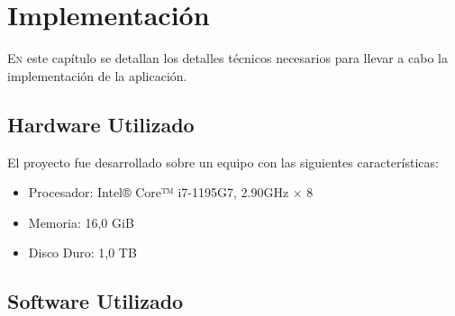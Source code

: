\chapter{Implementación}
\label{chap:implementacion}


\lettrine{E}{n} este capítulo se detallan los detalles técnicos necesarios para llevar a cabo la implementación de la aplicación.


\section{Hardware Utilizado}
\label{sec:hw}
El proyecto fue desarrollado sobre un equipo con las siguientes características:
\begin{itemize}
\item Procesador: Intel® Core™ i7-1195G7, 2.90GHz × 8
\item Memoria: 16,0 GiB
\item Disco Duro: 1,0 TB
\end{itemize}
	

\section{Software Utilizado}
\label{sec:sw}	

